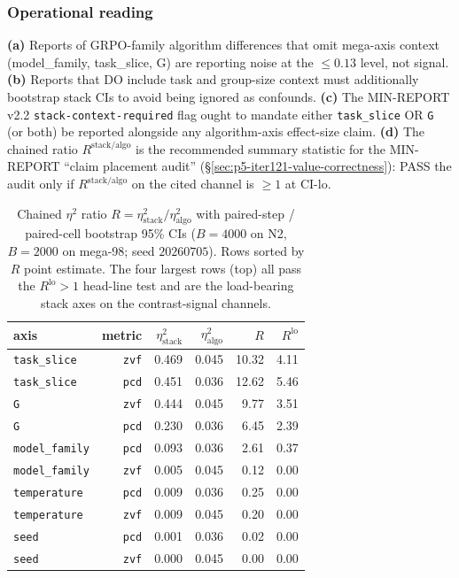\documentclass{article}  \usepackage[preprint,nonatbib]{neurips_2026} \usepackage[numbers]{natbib}
\begin{document}
\subsubsection{Operational reading}
\label{sec:p5-iter125-operational}
\textbf{(a)} Reports of GRPO-family algorithm differences that omit
mega-axis context (model\_family, task\_slice, G) are reporting noise
at the $\leq 0.13$ level, not signal. \textbf{(b)} Reports that DO
include task and group-size context must additionally bootstrap stack
CIs to avoid being ignored as confounds. \textbf{(c)} The MIN-REPORT
v2.2 \texttt{stack-context-required} flag ought to mandate either
\texttt{task\_slice} OR \texttt{G} (or both) be reported alongside
any algorithm-axis effect-size claim. \textbf{(d)} The chained ratio
$R^{\mathrm{stack/algo}}$ is the recommended summary statistic for
the MIN-REPORT ``claim placement audit'' (\S\ref{sec:p5-iter121-value-correctness}):
PASS the audit only if $R^{\mathrm{stack/algo}}$ on the cited channel
is $\geq 1$ at CI-lo.

\begin{table}[ht]
\centering\small
\begin{tabular}{lrrrrr}
\toprule
axis & metric & $\eta^2_{\mathrm{stack}}$ & $\eta^2_{\mathrm{algo}}$ &
$R$ & $R^{\mathrm{lo}}$ \\
\midrule
\texttt{task\_slice} & \texttt{zvf}  & 0.469 & 0.045 & 10.32 & 4.11 \\
\texttt{task\_slice} & \texttt{pcd}  & 0.451 & 0.036 & 12.62 & 5.46 \\
\texttt{G}           & \texttt{zvf}  & 0.444 & 0.045 &  9.77 & 3.51 \\
\texttt{G}           & \texttt{pcd}  & 0.230 & 0.036 &  6.45 & 2.39 \\
\midrule
\texttt{model\_family} & \texttt{pcd} & 0.093 & 0.036 & 2.61 & 0.37 \\
\texttt{model\_family} & \texttt{zvf} & 0.005 & 0.045 & 0.12 & 0.00 \\
\texttt{temperature}  & \texttt{pcd} & 0.009 & 0.036 & 0.25 & 0.00 \\
\texttt{temperature}  & \texttt{zvf} & 0.009 & 0.045 & 0.20 & 0.00 \\
\texttt{seed}         & \texttt{pcd} & 0.001 & 0.036 & 0.02 & 0.00 \\
\texttt{seed}         & \texttt{zvf} & 0.000 & 0.045 & 0.00 & 0.00 \\
\bottomrule
\end{tabular}
\caption{Chained $\eta^2$ ratio $R = \eta^2_{\mathrm{stack}} /
\eta^2_{\mathrm{algo}}$ with paired-step / paired-cell bootstrap 95\%
CIs ($B{=}4000$ on N2, $B{=}2000$ on mega-98; seed $20260705$). Rows
sorted by $R$ point estimate. The four largest rows (top) all pass the
$R^{\mathrm{lo}} > 1$ head-line test and are the load-bearing stack
axes on the contrast-signal channels.}
\label{tab:p5-iter125-chained}
\end{table}
\end{document}
